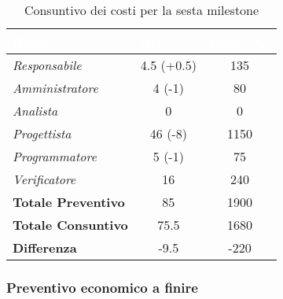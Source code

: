 \begin{table}[H]
    \renewcommand\arraystretch{1.5}
    \centering
    \begin{tabular}{|l|c|c|}
    \hline
    \rowcolor[HTML]{036400}
    \textcolor{white}{\textbf{Ruolo}} & \multicolumn{1}{l|}{\textcolor{white}{\textbf{Ore}}} & \multicolumn{1}{l|}{\textcolor{white}{\textbf{Costo (€)}}} \\ \hline
    \rowcolor[HTML]{EFEFEF}\textit{Responsabile}      & 4.5 (+0.5)   & 135                 \\ \hline
    \rowcolor[HTML]{C0C0C0}\textit{Amministratore}    & 4 (-1)       & 80                 \\ \hline
    \rowcolor[HTML]{EFEFEF}\textit{Analista}          & 0            & 0                 \\ \hline
    \rowcolor[HTML]{C0C0C0}\textit{Progettista}       & 46 (-8)      & 1150                 \\ \hline
    \rowcolor[HTML]{EFEFEF}\textit{Programmatore}     & 5 (-1)       & 75                 \\ \hline
    \rowcolor[HTML]{C0C0C0}\textit{Verificatore}      & 16           & 240                 \\ \hline
    \rowcolor[HTML]{EFEFEF}\textbf{Totale Preventivo} & 85           & 1900                \\ \hline
    \rowcolor[HTML]{C0C0C0}\textbf{Totale Consuntivo} & 75.5         & 1680            \\ \hline
    \rowcolor[HTML]{EFEFEF}\textbf{Differenza}        & -9.5         & -220                \\ \hline
    \end{tabular}
    \caption{Consuntivo dei costi per la sesta milestone}
\end{table}

\subsubsection{Preventivo economico a finire}

